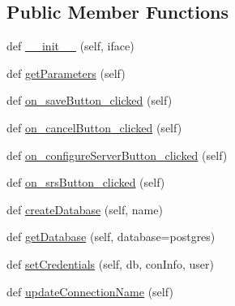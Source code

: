 \subsection*{Public Member Functions}
\begin{DoxyCompactItemize}
\item 
def \mbox{\hyperlink{class_dsg_tools_1_1_db_tools_1_1_post_g_i_s_tool_1_1postgis_d_b_tool_1_1_postgis_d_b_tool_ae45b177567ac876a38ca6aeb80a9a62a}{\+\_\+\+\_\+init\+\_\+\+\_\+}} (self, iface)
\item 
def \mbox{\hyperlink{class_dsg_tools_1_1_db_tools_1_1_post_g_i_s_tool_1_1postgis_d_b_tool_1_1_postgis_d_b_tool_a6a72f1e483e8218f58d0e5ef7a2b19a0}{get\+Parameters}} (self)
\item 
def \mbox{\hyperlink{class_dsg_tools_1_1_db_tools_1_1_post_g_i_s_tool_1_1postgis_d_b_tool_1_1_postgis_d_b_tool_aaf3a0db048ca58b5535283c1c9fbd232}{on\+\_\+save\+Button\+\_\+clicked}} (self)
\item 
def \mbox{\hyperlink{class_dsg_tools_1_1_db_tools_1_1_post_g_i_s_tool_1_1postgis_d_b_tool_1_1_postgis_d_b_tool_ac9741a4f69c5a1121c32e667318ff319}{on\+\_\+cancel\+Button\+\_\+clicked}} (self)
\item 
def \mbox{\hyperlink{class_dsg_tools_1_1_db_tools_1_1_post_g_i_s_tool_1_1postgis_d_b_tool_1_1_postgis_d_b_tool_a9a169080cfb0ab0ffe5dcbd9370d1e8a}{on\+\_\+configure\+Server\+Button\+\_\+clicked}} (self)
\item 
def \mbox{\hyperlink{class_dsg_tools_1_1_db_tools_1_1_post_g_i_s_tool_1_1postgis_d_b_tool_1_1_postgis_d_b_tool_a4afac89baadc10fdf00f333fcae4abdb}{on\+\_\+srs\+Button\+\_\+clicked}} (self)
\item 
def \mbox{\hyperlink{class_dsg_tools_1_1_db_tools_1_1_post_g_i_s_tool_1_1postgis_d_b_tool_1_1_postgis_d_b_tool_ace7579b7cb8b1d20e7f25053f06b60cb}{create\+Database}} (self, name)
\item 
def \mbox{\hyperlink{class_dsg_tools_1_1_db_tools_1_1_post_g_i_s_tool_1_1postgis_d_b_tool_1_1_postgis_d_b_tool_a26ad4391d1bd02ea5d91f99c762031c6}{get\+Database}} (self, database=\textquotesingle{}postgres\textquotesingle{})
\item 
def \mbox{\hyperlink{class_dsg_tools_1_1_db_tools_1_1_post_g_i_s_tool_1_1postgis_d_b_tool_1_1_postgis_d_b_tool_a20384954a18f0c1c987c01c7a1ba4db1}{set\+Credentials}} (self, db, con\+Info, user)
\item 
def \mbox{\hyperlink{class_dsg_tools_1_1_db_tools_1_1_post_g_i_s_tool_1_1postgis_d_b_tool_1_1_postgis_d_b_tool_a8e83dd803b5cf94e8bf42974a3d91635}{update\+Connection\+Name}} (self)

\end{DoxyCompactItemize}
